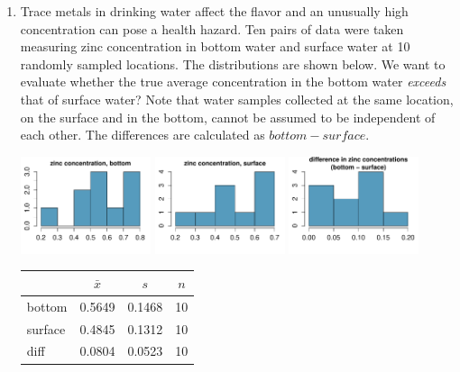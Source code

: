 \documentclass[12pt]{article}
\begin{document}
\begin{enumerate}

\item Trace metals in drinking water affect the flavor and an unusually high concentration can pose a 
health hazard. Ten pairs of data were taken measuring zinc concentration in bottom water and surface 
water at 10 randomly sampled locations. The distributions are shown below. We want to evaluate 
whether the true average concentration in the bottom water \emph{exceeds} that of surface water? 
Note that water samples collected at the same location, on the surface and in the bottom, cannot be 
assumed to be independent of each other. The differences are calculated as $bottom - surface$.

\begin{center}
\includegraphics[width=0.3\textwidth]{figures/zinc/zinc_bottom_hist}
\includegraphics[width=0.3\textwidth]{figures/zinc/zinc_surface_hist}
\includegraphics[width=0.3\textwidth]{figures/zinc/zinc_diff_hist}
{\small
\begin{tabular}{lccc}
\hline
			& $\bar{x}$ 	& $s$	& $n$ \\
\hline
bottom		& 0.5649		& 0.1468	& 10 \\
surface		& 0.4845		& 0.1312	& 10 \\
diff			& 0.0804		& 0.0523	& 10 \\
\hline
\end{tabular}
}
\end{center}

\begin{enumerate}


\end{enumerate}
\end{enumerate}
\end{document}
